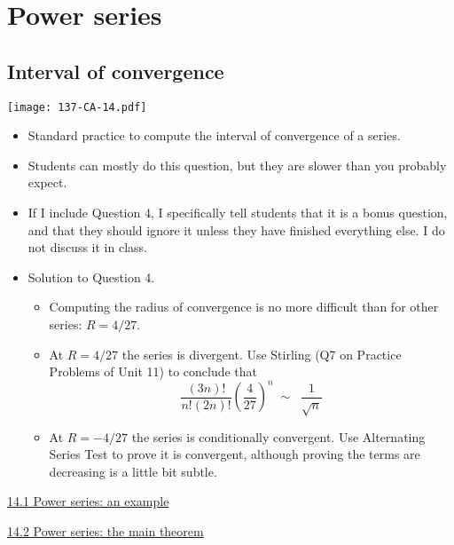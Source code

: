 \documentclass[11pt]{article}
\newcommand{\nl}{\hfill \vspace{-1.1\baselineskip}} %
\newcommand{\vi}{\hspace{8mm}  \href{https://www.youtube.com/watch?v=CYAPZikmuM4&list=PLlwePzQY_wW9h32ZwS6CYsY4eR_b2pE9j}{14.1 Power series: an example}}
\newcommand{\vii}{\hspace{8mm}  \href{https://www.youtube.com/watch?v=IEH7d9XiqqA&list=PLlwePzQY_wW9h32ZwS6CYsY4eR_b2pE9j&index=2}{14.2 Power series: the main theorem}}
\begin{document}
\vspace{3mm}
\tableofcontents

\newpage
\section{Power series}
\subsection{Interval of convergence}

\begin{center}
{ \texttt{[image: 137-CA-14.pdf]}} 
\end{center}

\begin{comments}
\nl
	\begin{itemize}
		\item Standard practice to compute the interval of convergence of a series.  
		\item Students can mostly do this question, but they are slower than you probably expect.
		\item If I include Question 4, I specifically tell students that it is a bonus question, and that they should ignore it unless they have finished everything else.  I do not discuss it in class.
		\item Solution to Question 4.
			\begin{itemize}
				\item  Computing the radius of convergence is no more difficult than for other series:  $R = 4/27$.
				\item  At $R=4/27$ the series is divergent.  Use Stirling (Q7 on Practice Problems of Unit 11) to conclude that
					$$
						 \frac{(3n)!}{n!(2n)!} \left(\frac{4}{27}\right)^n   \; \sim \; \; \frac{1}{\sqrt{n}}
					$$
				\item  At $R=-4/27$ the series is conditionally convergent.  Use Alternating Series Test to prove it is convergent, although proving the terms are decreasing is a little bit subtle.
			\end{itemize}
	\end{itemize}
\end{comments}

\begin{videos}
\vi

\vii
\end{videos}

\newpage
\end{document}
